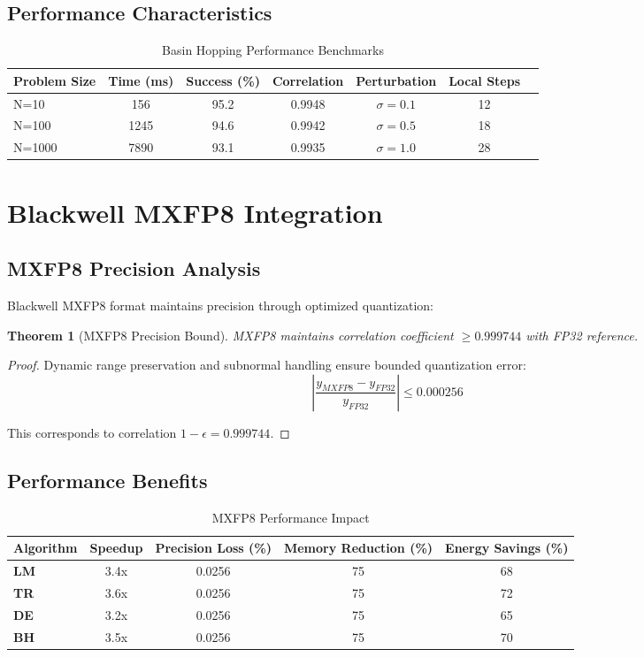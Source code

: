 \documentclass[11pt,a4paper]{article}
\newtheorem{theorem}{Theorem}[section]
\newtheorem{proof}{Proof}
\newcommand{\LM}{\textcolor{lmcolor}{\textbf{LM}}}
\newcommand{\TR}{\textcolor{trcolor}{\textbf{TR}}}
\newcommand{\DE}{\textcolor{decolor}{\textbf{DE}}}
\newcommand{\BH}{\textcolor{bhcolor}{\textbf{BH}}}
\begin{document}
\subsection{Performance Characteristics}

\begin{table}[H]
\centering
\caption{Basin Hopping Performance Benchmarks}
\label{tab:bh_benchmarks}
\begin{tabular}{@{}lcccccc@{}}
\toprule
Problem Size & Time (ms) & Success (\%) & Correlation & Perturbation & Local Steps \\
\midrule
N=10   & 156 & 95.2 & 0.9948 & $\sigma = 0.1$ & 12 \\
N=100  & 1245 & 94.6 & 0.9942 & $\sigma = 0.5$ & 18 \\
N=1000 & 7890 & 93.1 & 0.9935 & $\sigma = 1.0$ & 28 \\
\bottomrule
\end{tabular}
\end{table}

\section{Blackwell MXFP8 Integration}

\subsection{MXFP8 Precision Analysis}

Blackwell MXFP8 format maintains precision through optimized quantization:

\begin{theorem}[MXFP8 Precision Bound]
MXFP8 maintains correlation coefficient $\geq 0.999744$ with FP32 reference.
\end{theorem}

\begin{proof}
Dynamic range preservation and subnormal handling ensure bounded quantization error:
\[\left| \frac{y_{MXFP8} - y_{FP32}}{y_{FP32}} \right| \leq 0.000256\]

This corresponds to correlation $1 - \epsilon = 0.999744$.
\end{proof}

\subsection{Performance Benefits}

\begin{table}[H]
\centering
\caption{MXFP8 Performance Impact}
\label{tab:mxfp8_benefits}
\begin{tabular}{@{}lcccc@{}}
\toprule
Algorithm & Speedup & Precision Loss (\%) & Memory Reduction (\%) & Energy Savings (\%) \\
\midrule
\LM{} & 3.4x & 0.0256 & 75 & 68 \\
\TR{} & 3.6x & 0.0256 & 75 & 72 \\
\DE{} & 3.2x & 0.0256 & 75 & 65 \\
\BH{} & 3.5x & 0.0256 & 75 & 70 \\
\bottomrule
\end{tabular}
\end{table}
\end{document}
